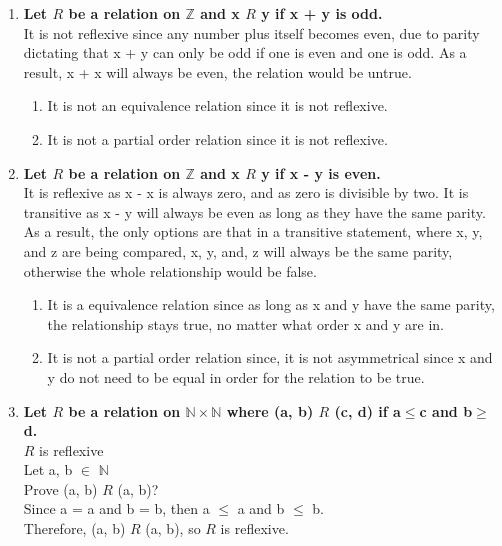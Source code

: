 \documentclass[a4paper]{article}
\begin{document}
\begin{enumerate}
    \item \boldmath \textbf{Let $R$ be a relation on $\mathbb{Z}$ and x $R$ y if x + y is odd.} \unboldmath \\
    It is not reflexive since any number plus itself becomes even, due to parity dictating that x + y can only be odd if one is even and one is odd. As a result, x + x will always be even, the relation would be untrue.
    \begin{enumerate}
        \item It is not an equivalence relation since it is not reflexive.
        \item It is not a partial order relation since it is not reflexive.
    \end{enumerate}
    
    \item \boldmath \textbf{Let $R$ be a relation on $\mathbb{Z}$ and x $R$ y if x - y is even.} \unboldmath \\
    It is reflexive as x - x is always zero, and as zero is divisible by two. It is transitive as x - y will always be even as long as they have the same parity. As a result, the only options are that in a transitive statement, where x, y, and z are being compared, x, y, and, z will always be the same parity, otherwise the whole relationship would be false.
    \begin{enumerate}
        \item It is a equivalence relation since as long as x and y have the same parity, the relationship stays true, no matter what order x and y are in.
        \item It is not a partial order relation since, it is not asymmetrical since x and y do not need to be equal in order for the relation to be true.
    \end{enumerate}
    
    
    \item \boldmath \textbf{Let $R$ be a relation on $\mathbb{N} \times \mathbb{N}$ where (a, b) $R$ (c, d) if a$\le$c and b$\ge$d.} \unboldmath \\
    $R$ is reflexive \\
    Let a, b $\in$ $\mathbb{N}$ \\
    Prove (a, b) $R$ (a, b)? \\
    Since a = a and b = b, then a $\le$ a and b $\le$ b. \\
    Therefore, (a, b) $R$ (a, b), so $R$ is reflexive.
    

\end{enumerate}
\end{document}
